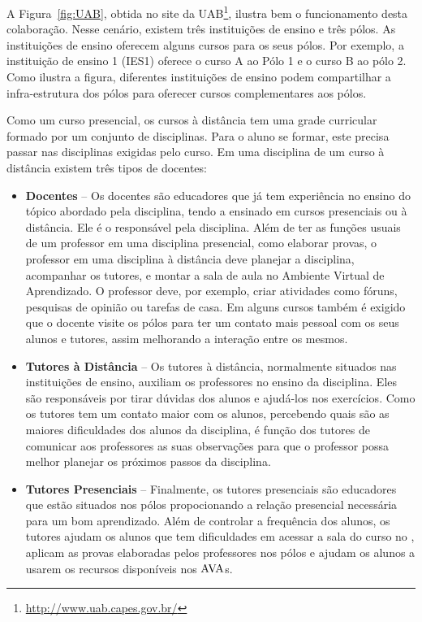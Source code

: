 A Figura~\ref{fig:UAB}, obtida no site da UAB\footnote{\url{http://www.uab.capes.gov.br/}}, 
ilustra bem o funcionamento desta colaboração. Nesse cenário, existem três instituições
de ensino e três pólos. As instituições de ensino oferecem alguns cursos para os seus 
pólos. Por exemplo, a instituição de ensino 1 (IES1) oferece o curso A ao Pólo 1 e 
o curso B ao pólo 2. Como ilustra a figura, diferentes instituições de ensino podem
compartilhar a infra-estrutura dos pólos para oferecer cursos complementares aos pólos.

Como um curso presencial, os cursos à distância tem uma grade curricular formado 
por um conjunto de disciplinas. Para o aluno se formar, este precisa passar nas disciplinas
exigidas pelo curso. Em uma disciplina de um curso à distância existem três tipos de docentes:
\begin{itemize}
 \item \textbf{Docentes} -- Os docentes são educadores que já tem experiência no ensino do tópico 
 abordado pela disciplina, tendo a ensinado em cursos presenciais ou à distância. Ele é o responsável 
 pela disciplina. Além de ter as funções usuais de um professor em uma disciplina presencial, como 
 elaborar provas, 
 o professor em uma disciplina à distância deve planejar a disciplina, acompanhar os tutores, e montar a sala de aula 
 no Ambiente Virtual de Aprendizado. O professor deve, por exemplo, criar
atividades como fóruns, pesquisas de opinião ou tarefas de casa.
 Em alguns cursos também é exigido que o docente visite os pólos para ter um contato mais pessoal 
 com os seus alunos e tutores, assim melhorando a interação entre os mesmos.
 
 \item \textbf{Tutores à Distância} -- Os tutores à distância, normalmente situados nas instituições de ensino, 
 auxiliam os professores no ensino da disciplina. Eles são responsáveis por tirar dúvidas dos alunos e ajudá-los 
 nos exercícios. Como os tutores tem um contato maior com os alunos, percebendo quais são as maiores 
 dificuldades dos alunos da disciplina, é função dos tutores de comunicar aos professores as suas observações para
 que o professor possa melhor planejar os próximos passos da disciplina. 
 
 
 \item \textbf{Tutores Presenciais} -- Finalmente, os tutores presenciais são educadores que estão situados nos pólos
 propocionando a relação presencial necessária para um bom aprendizado. 
Além de controlar a frequência dos alunos, os tutores  ajudam os alunos que tem
dificuldades em acessar a sala do curso no 
 \ava, aplicam as provas elaboradas pelos professores nos pólos e 
 ajudam os alunos a usarem os recursos disponíveis nos $\hbox{AVA}$s. 
\end{itemize}

